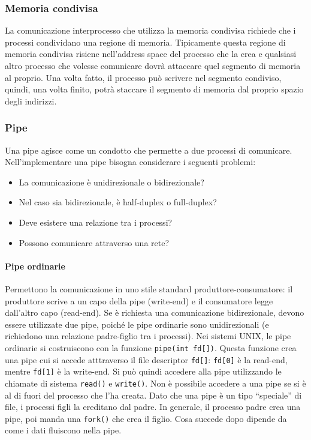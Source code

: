 \documentclass[a4paper]{article}
\begin{document}
\subsubsection{Memoria condivisa}
La comunicazione interprocesso che utilizza la memoria condivisa richiede che i processi condividano una regione di memoria. Tipicamente questa regione di memoria condivisa risiene nell'address space del processo che la crea e qualsiasi altro processo che volesse comunicare dovrà attaccare quel segmento di memoria al proprio. Una volta fatto, il processo può scrivere nel segmento condiviso, quindi, una volta finito, potrà staccare il segmento di memoria dal proprio spazio degli indirizzi.

\subsubsection{Pipe}
Una pipe agisce come un condotto che permette a due processi di comunicare. Nell'implementare una pipe bisogna considerare i seguenti problemi:
\begin{itemize}
   \item La comunicazione è unidirezionale o bidirezionale?
   \item Nel caso sia bidirezionale, è half-duplex o full-duplex?
   \item Deve esistere una relazione tra i processi?
   \item Possono comunicare attraverso una rete?
\end{itemize}
\paragraph{Pipe ordinarie} Permettono la comunicazione in uno stile standard produttore-consumatore: il produttore scrive a un capo della pipe (write-end) e il consumatore legge dall'altro capo (read-end). Se è richiesta una comunicazione bidirezionale, devono essere utilizzate due pipe, poiché le pipe ordinarie sono unidirezionali (e richiedono una relazione padre-figlio tra i processi). \newline
Nei sistemi UNIX, le pipe ordinarie si costruiscono con la funzione \texttt{pipe(int fd[])}. Questa funzione crea una pipe cui si accede atttraverso il file descriptor \texttt{fd[]}: \texttt{fd[0]} è la read-end, mentre \texttt{fd[1]} è la write-end. Si può quindi accedere alla pipe utilizzando le chiamate di sistema \texttt{read()} e \texttt{write()}. Non è possibile accedere a una pipe se si è al di fuori del processo che l'ha creata. Dato che una pipe è un tipo ``speciale'' di file, i processi figli la ereditano dal padre. In generale, il processo padre crea una pipe, poi manda una \texttt{fork()} che crea il figlio. Cosa succede dopo dipende da come i dati fluiscono nella pipe.
\end{document}
